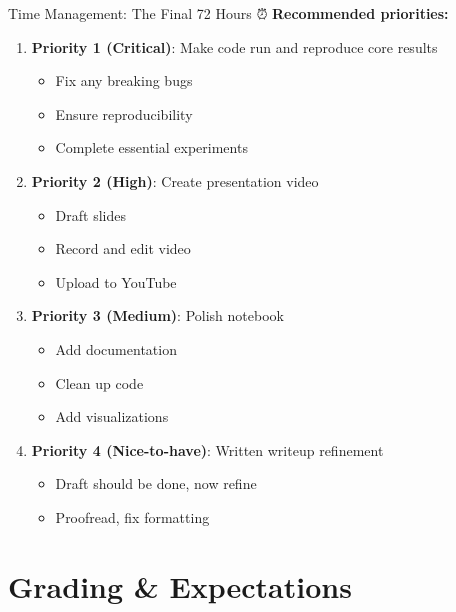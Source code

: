 \documentclass[aspectratio=169]{beamer}
\begin{document}
\begin{frame}[shrink=10]{Time Management: The Final 72 Hours ⏰}
\textbf{Recommended priorities:}

\begin{enumerate}\setlength{\itemsep}{0pt}
    \item \textbf{Priority 1 (Critical)}: Make code run and reproduce core results
    \begin{itemize}\setlength{\itemsep}{0pt}
        \item Fix any breaking bugs
        \item Ensure reproducibility
        \item Complete essential experiments
    \end{itemize}

    \item \textbf{Priority 2 (High)}: Create presentation video
    \begin{itemize}\setlength{\itemsep}{0pt}
        \item Draft slides
        \item Record and edit video
        \item Upload to YouTube
    \end{itemize}

    \item \textbf{Priority 3 (Medium)}: Polish notebook
    \begin{itemize}\setlength{\itemsep}{0pt}
        \item Add documentation
        \item Clean up code
        \item Add visualizations
    \end{itemize}

    \item \textbf{Priority 4 (Nice-to-have)}: Written writeup refinement
    \begin{itemize}\setlength{\itemsep}{0pt}
        \item Draft should be done, now refine
        \item Proofread, fix formatting
    \end{itemize}
\end{enumerate}
\end{frame}

\section{Grading \& Expectations}
\end{document}

